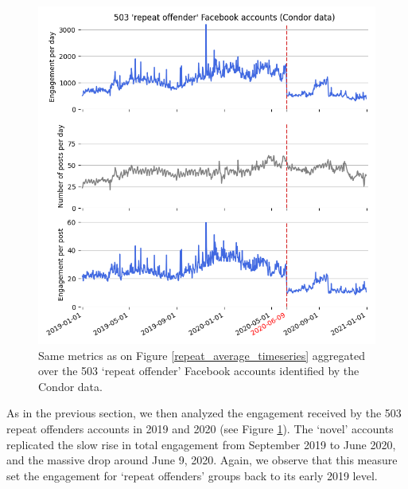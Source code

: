 \documentclass[review]{elsarticle}
\begin{document}
\begin{figure}[!h]
\centering
\includegraphics[scale=0.5]{./../figure/condor_average_timeseries.png}
\caption{
Same metrics as on Figure \ref{repeat_average_timeseries} aggregated over the 503 `repeat offender' Facebook accounts identified by the Condor data.
}
\label{condor_average_timeseries}
\end{figure}

As in the previous section, we then analyzed the engagement received by the 503 repeat offenders accounts in 2019 and 2020 (see Figure \ref{condor_average_timeseries}). 
The `novel' accounts replicated the slow rise in total engagement from September 2019 to June 2020, and the massive drop around June 9, 2020.
Again, we observe that this measure set the engagement for ‘repeat offenders’ groups back to its early 2019 level.
\end{document}
